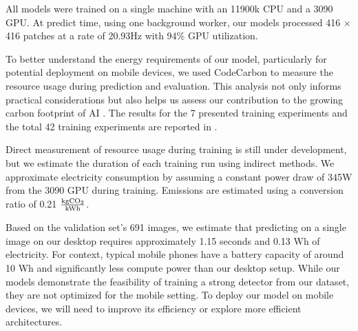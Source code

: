 All models were trained on a single machine with an 11900k CPU and a 3090 GPU.
At predict time, using one background worker, our models processed 416 $\times$ 416 patches at a rate of
  20.93Hz with 94\% GPU utilization.

To better understand the energy requirements of our model, particularly for potential deployment on mobile
  devices, we used CodeCarbon \cite{lacoste2019codecarbon} to measure the resource usage during prediction and
  evaluation.
This analysis not only informs practical considerations but also helps us assess our contribution to the
  growing carbon footprint of AI \cite{kirkpatrick_carbon_2023}.
The results for the 7 presented training experiments and the total 42 training experiments are reported in
  .

Direct measurement of resource usage during training is still under development, but we estimate the
  duration of each training run using indirect methods.
We approximate electricity consumption by assuming a constant power draw of 345W from the 3090 GPU during
  training.
Emissions are estimated using a conversion ratio of 0.21 $\frac{\textrm{kg}\mathrm{CO_2}{}}{\textrm{kWh}}$.
% 
  
Based on the validation set's 691 images, we estimate that predicting on a single image on our desktop
  requires approximately 1.15 seconds and 0.13 Wh of electricity.
For context, typical mobile phones have a battery capacity of around 10 Wh and significantly less compute
  power than our desktop setup.
While our models demonstrate the feasibility of training a strong detector from our dataset, they are not
  optimized for the mobile setting.
To deploy our model on mobile devices, we will need to improve its efficiency or explore more efficient
  architectures.
